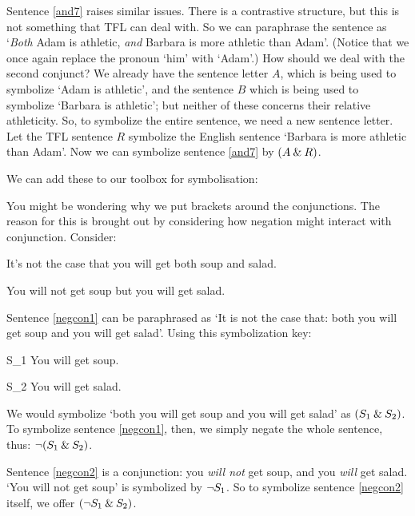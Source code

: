 Sentence \ref{and7} raises similar issues. There is a contrastive structure, but this is not something that TFL can deal with. So we can paraphrase the sentence as `\emph{Both} Adam is athletic, \emph{and} Barbara is more athletic than Adam'. (Notice that we once again replace the pronoun `him' with `Adam'.) How should we deal with the second conjunct? We already have the sentence letter $A$, which is being used to symbolize `Adam is athletic', and the sentence $B$ which is being used to symbolize `Barbara is athletic'; but neither of these concerns their relative athleticity. So, to symbolize the entire sentence, we need a new sentence letter. Let the TFL sentence $R$ symbolize the English sentence `Barbara is more athletic than Adam'. Now we can symbolize sentence \ref{and7} by $(A \mathbin{\&} R)$.

We can add these to our toolbox for symbolisation:

You might be wondering why we put brackets around the conjunctions. The reason for this is brought out by considering how negation might interact with conjunction. Consider:
	\begin{earg}
		\item[\ex{negcon1}] It's not the case that you will get both soup and salad.
		\item[\ex{negcon2}] You will not get soup but you will get salad.
	\end{earg}
Sentence \ref{negcon1} can be paraphrased as `It is not the case that: both you will get soup and you will get salad'. Using this symbolization key:
	\begin{ekey}
		\item[S_1] You will get soup.
		\item[S_2] You will get salad.
	\end{ekey}
We would symbolize `both you will get soup and you will get salad' as $(S_1 \mathbin{\&} S_2)$. To symbolize sentence \ref{negcon1}, then, we simply negate the whole sentence, thus: $\neg (S_1 \mathbin{\&} S_2)$. 

Sentence \ref{negcon2} is a conjunction: you \emph{will not} get soup, and you \emph{will} get salad. `You will not get soup' is symbolized by $\neg S_1$. So to symbolize sentence \ref{negcon2} itself, we offer $(\neg S_1 \mathbin{\&} S_2)$. 

